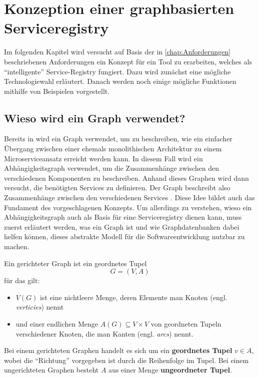 \chapter{Konzeption einer graphbasierten Serviceregistry}

Im folgenden Kapitel wird versucht auf Basis der in \vref{chap:Anforderungen} beschriebenen Anforderungen ein Konzept für ein Tool zu erarbeiten, welches als \enquote{intelligente} Service-Registry fungiert. Dazu wird zunächst eine mögliche Technologiewahl erläutert. Danach werden noch einige mögliche Funktionen mithilfe von Beispielen vorgestellt.

\section{Wieso wird ein Graph verwendet?}

Bereits in \citeauthor{Ren2018} wird ein Graph verwendet, um zu beschreiben, wie ein einfacher Übergang zwischen einer ehemals monolithischen Architektur zu einem Microserviceansatz erreicht werden kann. In diesem Fall wird ein Abhängigkeitsgraph verwendet, um die Zusammenhänge zwischen den verschiedenen Komponenten zu beschreiben. Anhand dieses Graphen wird dann versucht, die benötigten Services zu definieren. Der Graph beschreibt also Zusammenhänge zwischen den verschiedenen Services \autocite[Kapitel 3.2 \& Kapitel 3.3]{Ren2018}. Diese Idee bildet auch das Fundament des vorgeschlagenen Konzepts. Um allerdings zu verstehen, wieso ein Abhängigkeitsgraph auch als Basis für eine Serviceregistry dienen kann, muss zuerst erläutert werden, was ein Graph ist und wie Graphdatenbanken dabei helfen können, dieses abstrakte Modell für die Softwareentwicklung nutzbar zu machen.

\begin{definition}\autocite[Kapitel 1.2]{Bang-Jensen2007}
	Ein gerichteter Graph ist ein geordnetes Tupel $$G = (V,A)$$ für das gilt:
	\begin{itemize}
		\item $V(G)$ ist eine nichtleere Menge, deren Elemente man Knoten (engl. \textit{verticies}) nennt
		\item und einer endlichen Menge $A(G) \subseteq V \times V$ von geordneten Tupeln verschiedener Knoten, die man Kanten (engl. \textit{arcs}) nennt.
	\end{itemize}

	Bei einem gerichteten Graphen handelt es sich um ein \textbf{geordnetes Tupel} $v \in A$, wobei die \enquote{Richtung} vorgegeben ist durch die Reihenfolge im Tupel. Bei einem ungerichteten Graphen besteht $A$ aus einer Menge \textbf{ungeordneter Tupel}.
\end{definition}

